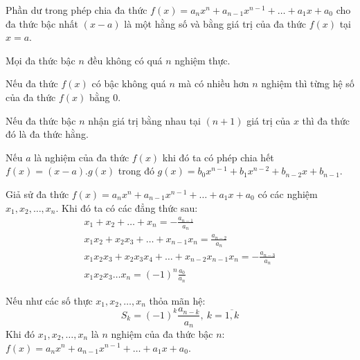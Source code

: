 \begin{mybox}
\begin{theorem}
	Phần dư trong phép chia đa thức $f(x) = a_nx^n + a_{n - 1}x^{n - 1} + \ldots + a_1x + a_0$ cho đa thức bậc nhất $(x - a)$ là một hằng số và bằng giá trị của đa thức $f(x)$ tại $x = a$.
\end{theorem}
\end{mybox}

\begin{corollary}[1]
Mọi đa thức bậc $n$ đều không có quá $n$ nghiệm thực.
\end{corollary}

\begin{corollary}[1.1]
Nếu đa thức $f(x)$ có bậc không quá $n$ mà có nhiều hơn $n$ nghiệm thì từng hệ số của đa thức $f(x)$ bằng $0$.
\end{corollary}

\begin{corollary}[1.2]
Nếu đa thức bậc $n$ nhận giá trị bằng nhau tại $(n + 1)$ giá trị của $x$ thì đa thức đó là đa thức hằng.
\end{corollary}

\begin{corollary}[2]
	Nếu $a$ là nghiệm của đa thức $f(x)$ khi đó ta có phép chia hết $f(x) = (x - a).g(x)$ trong đó $g(x) = b_0x^{n - 1} + b_1x^{n - 2} + b_{n - 2}x + b_{n - 1}$.
\end{corollary}

\begin{mybox}
\begin{theorem}[Viète]
	Giả sử đa thức $f(x) = a_nx^n + a_{n - 1}x^{n - 1} + \ldots + a_1x + a_0$ có các nghiệm $x_1, x_2, \ldots, x_n$. Khi đó ta có các đẳng thức sau:
	\begin{align*}
		x_1 + x_2 + \ldots + x_n = -\frac{a_{n - 1}}{a_n} \\
		x_1 x_2 + x_2 x_3 + \ldots + x_{n - 1} x_{n} = \frac{a_{n - 2}}{a_n} \\
		x_1 x_2 x_3 + x_2 x_3 x_4 + \ldots + x_{n - 2} x_{n - 1} x_n = -\frac{a_{n - 3}}{a_n} \\ 
		x_1 x_2 x_3 \ldots x_n = (-1)^n \frac{a_0}{a_n}
	\end{align*}
\end{theorem}

\begin{theorem}
	Nếu như các số thực $x_1, x_2, \ldots, x_n$ thỏa mãn hệ:
	\[
		S_k = (-1)^k \frac{a_{n - k}}{a_n},\ k = \overline{1, k} 
	\]
	Khi đó $x_1, x_2, \ldots, x_n$ là $n$ nghiệm của đa thức bậc $n$: $f(x) = a_nx^n + a_{n - 1}x^{n - 1} + \ldots + a_1x + a_0$.
\end{theorem}
\end{mybox}
